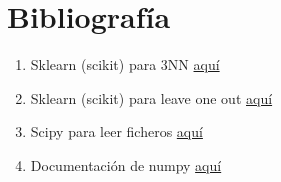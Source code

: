\documentclass[12pt]{article}
\begin{document}
\section{Bibliografía}
\begin{enumerate}
\item Sklearn (scikit) para 3NN \href{http://scikit-learn.org/stable/modules/neighbors.html}{aquí}
\item Sklearn (scikit) para leave one out \href{http://scikit-learn.org/stable/modules/generated/sklearn.cross_validation.LeaveOneOut.html}{aquí}
\item Scipy para leer ficheros \href{arff http://docs.scipy.org/doc/scipy/reference/generated/scipy.io.arff.loadarff.html}{aquí}
\item Documentación de numpy \href{http://docs.scipy.org/doc/numpy/user/index.html}{aquí}
\end{enumerate}
\end{document}

